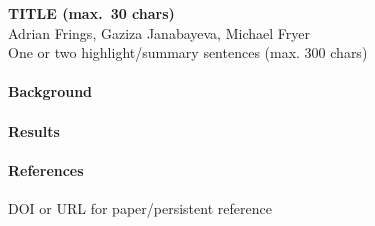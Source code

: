 \documentclass[10pt,a4paper]{article} %
\begin{document}
\begin{center}
    {\large\bfseries TITLE (max.\ 30 chars)}\\[0.5em]
    {\small Adrian Frings, Gaziza Janabayeva, Michael Fryer}\\[1em]
    {\small One or two highlight/summary sentences (max. 300 chars)}
\end{center}


\paragraph{Background}

\paragraph{Results}

\paragraph{References}
\begin{enumerate}[label={[\arabic*]}]
    \item DOI or URL for paper/persistent reference
\end{enumerate}
\end{document}
